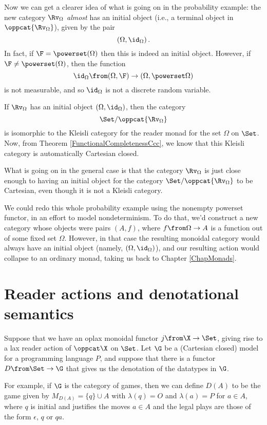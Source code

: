 Now we can get a clearer idea of what is going on in the probability example: the new category $\Rv_\Omega$ \emph{almost} has an initial object (i.e., a terminal object in $\oppcat{\Rv_\Omega}$), given by the pair
\[
  (\Omega,\id_\Omega)\,.
  \]
In fact, if $\F=\powerset(\Omega)$ then this is indeed an initial object.
However, if $\F\ne\powerset(\Omega)$, then the function
\[
  \id_\Omega \from (\Omega,\F) \to (\Omega,\powerset\Omega)
  \]
is not measurable, and so $\id_\Omega$ is not a discrete random variable.

If $\Rv_\Omega$ has an initial object $(\Omega,\id_\Omega)$, then the category
\[
  \Set/\oppcat{\Rv_\Omega}
  \]
is isomorphic to the Kleisli category for the reader monad for the set $\Omega$ on $\Set$.  
Now, from Theorem \ref{FunctionalCompletenessCcc}, we know that this Kleisli category is automatically Cartesian closed.  

What is going on in the general case is that the category $\Rv_\Omega$ is just close enough to having an initial object for the category $\Set/\oppcat{\Rv_\Omega}$ to be Cartesian, even though it is not a Kleisli category.

\begin{remark}
  We could redo this whole probability example using the nonempty powerset functor, in an effort to model nondeterminism. 
  To do that, we'd construct a new category whose objects were pairs $(A,f)$, where $f\from \Omega \to A$ is a function out of some fixed set $\Omega$.
  However, in that case the resulting monoidal category would always have an initial object (namely, $(\Omega, \id_\Omega)$), and our resulting action would collapse to an ordinary monad, taking us back to Chapter \ref{ChapMonads}.
\end{remark}

\section{Reader actions and denotational semantics}

Suppose that we have an oplax monoidal functor $j \from \X \to \Set$, giving rise to a lax reader action of $\oppcat\X$ on $\Set$.
Let $\G$ be a (Cartesian closed) model for a programming language $P$, and suppose that there is a functor $D\from \Set \to \G$ that gives us the denotation of the datatypes in $\G$.

For example, if $\G$ is the category of games, then we can define $D(A)$ to be the game given by $M_{D(A)} = \{q\}\cup A$ with $\lambda(q)=O$ and $\lambda(a)=P$ for $a\in A$, where $q$ is initial and justifies the moves $a\in A$ and the legal plays are those of the form $\epsilon$, $q$ or $qa$.

